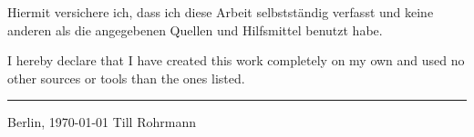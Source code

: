 \clearemptydoublepage
\thispagestyle{empty}

\vspace*{2cm}

\begin{center}
\end{center}

\vspace{10mm}
\noindent
Hiermit versichere ich, dass ich diese Arbeit selbst\-ständig verfasst und keine anderen als die angegebenen Quellen und Hilfsmittel benutzt habe. \\

\noindent I hereby declare that I have created this work completely on my own and used no other sources or tools than the ones listed.

\vspace*{\fill}
\begin{flushright}

\rule{90mm}{1pt}

Berlin, \today \hspace{15 mm} Till Rohrmann
\end{flushright}

